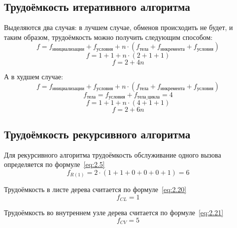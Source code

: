 \subsection{Трудоёмкость итеративного алгоритма}
Выделяются два случая: в лучшем случае, обменов происходить не будет, и таким образом, трудоёмкость можно получить следующим способом:
\begin{equation}
	f = f_{\text{инициализации}} + f_{\text{условия}} + n \cdot (f_{\text{тела}} + f_{\text{инкремента}} + f_{\text{условия}})
\end{equation}
\begin{equation}
	f = 1 + 1 + n \cdot (2 + 1 + 1)
\end{equation}
\begin{equation}
	f = 2 + 4n
\end{equation}

А в худшем случае:
\begin{equation}
	f = f_{\text{инициализации}} + f_{\text{условия}} + n \cdot (f_{\text{тела}} + f_{\text{инкремента}} + f_{\text{условия}})
\end{equation}
\begin{equation}
	f_{\text{тела}} = 	f_{\text{условия}} + f_{\text{тела\_цикла}} = 4
 \end{equation}
\begin{equation}
	f = 1 + 1 + n \cdot (4 + 1 + 1)
\end{equation}
\begin{equation}
	f = 2 + 6n
\end{equation}

\subsection{Трудоёмкость рекурсивного алгоритма}
Для рекурсивного алгоритма трудоёмкость обслуживание одного вызова определяется по формуле \ref{eq:2.5}
\begin{equation}
	f_{R(1)} = 2 \cdot (1 + 1 + 0 + 0 + 0 + 1) = 6
\end{equation}

Трудоёмкость в листе дерева считается по формуле \ref{eq:2.20}
\begin{equation}
f_{CL} = 1
\label{eq:2.20}
\end{equation}

Трудоёмкость во внутреннем узле дерева считается по формуле \ref{eq:2.21}
\begin{equation}
	f_{CV} = 5
	\label{eq:2.21}
\end{equation}

